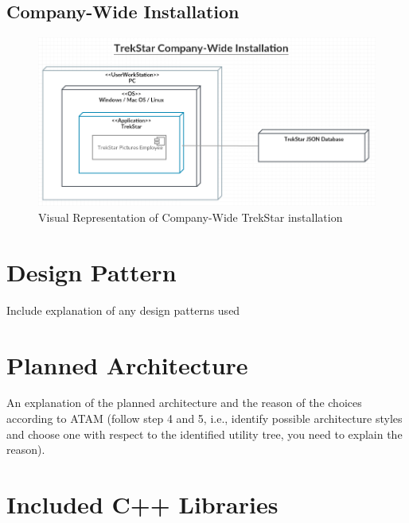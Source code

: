 \documentclass[
  english,
  a4paper,
,tablecaptionabove
]{scrartcl}
\begin{document}
\hypertarget{company-wide-installation}{%
\subsection{Company-Wide Installation}\label{company-wide-installation}}

\begin{figure}
\centering
\includegraphics{images/deployment-diagrams/trekstar-company-installation.png}
\caption{Visual Representation of Company-Wide TrekStar installation}
\end{figure}

\newpage

\hypertarget{design-pattern}{%
\section{Design Pattern}\label{design-pattern}}

Include explanation of any design patterns used

\newpage

\hypertarget{planned-architecture}{%
\section{Planned Architecture}\label{planned-architecture}}

An explanation of the planned architecture and the reason of the choices
according to ATAM (follow step 4 and 5, i.e., identify possible
architecture styles and choose one with respect to the identified
utility tree, you need to explain the reason).

\newpage

\hypertarget{included-c-libraries}{%
\section{Included C++ Libraries}\label{included-c-libraries}}
\end{document}
